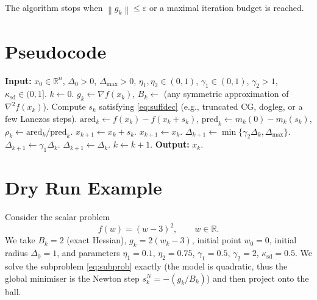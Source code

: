 \documentclass{article}
\newcommand{\RR}{\mathbb{R}}
\newcommand{\norm}[1]{\left\lVert#1\right\rVert}
\begin{document}
The algorithm stops when $\norm{g_{k}}\le\varepsilon$ or a maximal iteration budget is reached.

\section*{Pseudocode}
\begin{algorithm}[H]
\caption{TR‑Approx}
\begin{algorithmic}[1]
\State \textbf{Input:} $x_{0}\in\RR^{n}$, $\Delta_{0}>0$, $\Delta_{\max}>0$, 
$\eta_{1},\eta_{2}\in(0,1)$, $\gamma_{1}\in(0,1)$, $\gamma_{2}>1$, $\kappa_{\mathrm{sd}}\in(0,1]$.
\State $k\gets0$.
\While{ $\norm{\nabla f(x_{k})}> \varepsilon$ \textbf{and} $k< K_{\max}$}
    \State $g_{k}\gets\nabla f(x_{k})$, $B_{k}\gets$ (any symmetric approximation of $\nabla^{2}f(x_{k})$).
    \State Compute $s_{k}$ satisfying \eqref{eq:suffdec} (e.g., truncated CG, dogleg, or a few Lanczos steps).
    \State $\text{ared}_{k}\gets f(x_{k})-f(x_{k}+s_{k})$,
          $\text{pred}_{k}\gets m_{k}(0)-m_{k}(s_{k})$,
          $\rho_{k}\gets \text{ared}_{k}/\text{pred}_{k}$.
        \State $x_{k+1}\gets x_{k}+s_{k}$.
    \Else
        \State $x_{k+1}\gets x_{k}$.
    \EndIf
        \State $\Delta_{k+1}\gets \min\{\gamma_{2}\Delta_{k},\Delta_{\max}\}$.
        \State $\Delta_{k+1}\gets \gamma_{1}\Delta_{k}$.
    \Else
        \State $\Delta_{k+1}\gets \Delta_{k}$.
    \EndIf
    \State $k\gets k+1$.
\EndWhile
\State \textbf{Output:} $x_{k}$.
\end{algorithmic}
\end{algorithm}

\section*{Dry Run Example}
Consider the scalar problem
\[
f(w)=(w-3)^{2},\qquad w\in\RR .
\]
We take $B_{k}=2$ (exact Hessian), $g_{k}=2(w_{k}-3)$,
initial point $w_{0}=0$, initial radius $\Delta_{0}=1$, and parameters
$\eta_{1}=0.1$, $\eta_{2}=0.75$, $\gamma_{1}=0.5$, $\gamma_{2}=2$, $\kappa_{\mathrm{sd}}=0.5$.
We solve the subproblem \eqref{eq:subprob} exactly (the model is quadratic, thus the global minimiser is the Newton step $s_{k}^{N}=-(g_{k}/B_{k})$) and then project onto the ball.
\end{document}

